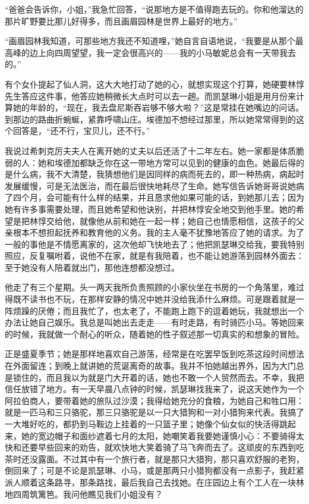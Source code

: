 \par “爸爸会告诉你，小姐，”我急忙回答，“说那地方是不值得跑去玩的。你和他溜达的那片旷野要比那儿好得多，而且画眉园林是世界上最好的地方。”
\par “画眉园林我知道，可那些地方我还不知道哩，”她自言自语地说，“我要是从那个最高峰的边上向四周望望，我一定会很高兴的——我的小马敏妮总会有一天带我去的。”
\par 有个女仆提起了仙人洞，这大大地打动了她的心，就想实现这个打算，她硬要林惇先生答应这件事，他答应她稍微长大点时可以去一趟。而凯瑟琳小姐是用月份来计算她的年龄的，“现在，我去盘尼斯吞岩够不够大啦？”这是常挂在她嘴边的问话。到那边的路曲折蜿蜒，紧靠呼啸山庄。埃德加不想经过那里，所以她常常得到的这个回答是，“还不行，宝贝儿，还不行。”
\par 我说过希刺克厉夫夫人在离开她的丈夫以后还活了十二年左右。她一家都是体质脆弱的人：她和埃德加都缺乏你在这一带地方常可以见到的健康的血色。她最后得的是什么病，我不大清楚，我猜想他们是因同样的病而死去的，即一种热病，病起时发展缓慢，可是无法医治，而在最后很快地耗尽了生命。她写信告诉她哥哥说她病了四个月，会可能有什么样的结果，并且恳求他如果可能的话，到她那儿去；因为她有许多事需要处理，而且她希望和他诀别，并把林惇安全地交到他手里。她的希望是把林惇交给他，就像他从前和她在一起一样；她自己也情愿相信，这孩子的父亲根本不想担起抚养和教育他的义务。我的主人毫不犹豫地答应了她的请求。为了一般的事他是不情愿离家的，这次他却飞快地去了；他把凯瑟琳交给我，要我特别照应，反复嘱咐着，说他不在家，就是有我陪着，也不能让她游荡到园林外面去：至于她没有人陪着就出门，那他连想都没想过。
\par 他走了有三个星期。头一两天我所负责照顾的小家伙坐在书房的一个角落里，难过得既不读书也不玩，在那样安静的情况中她并没给我添什么麻烦。可是跟着就是一阵烦躁的厌倦；而且我忙了，也太老了，不能跑上跑下的逗着她玩，我就想出一个办法让她自己娱乐。我总是叫她出去走走——有时走路，有时骑匹小马。等她回来的时候，我就做一个耐心的听众，随着她的性子叙述那一切真实的和想象的冒险。
\par 正是盛夏季节；她是那样地喜欢自己游荡，经常是在吃罢早饭到吃茶这段时间想法在外面留连；到晚上就讲她的荒诞离奇的故事。我并不怕她越出界外，因为大门总是锁住的，而且我以为就是门大开着的话，她也不敢一个人贸然而去。不幸，我把信任放错了地方。有一天早晨八点钟的时候，凯瑟琳找我来了，说这天她作为一个阿拉伯商人，要带着她的旅队过沙漠；我得给她充分的食粮，为她自己和牲口用：就是一匹马和三只骆驼，那三只骆驼是以一只大猎狗和一对小猎狗来代表。我搞了一大堆好吃的，都扔到马鞍边上挂着的一只篮子里；她像个仙女似的快活得跳起来，她的宽边帽子和面纱遮着七月的太阳，她嘲笑着我要她谨慎小心：不要骑得太快和还要早些回来的劝告，就欢快地大笑着骑了马飞奔而去了。这顽皮的东西到吃茶时还没露面。不过其中有一个旅行者，就是那只大猎狗，那只喜欢舒服的老狗，倒回来了；可是不论是凯瑟琳、小马，或是那两只小猎狗都没有一点影子，我赶紧派人顺着这条路寻，那条路找，最后我自己去找她。在庄园边上有个工人在一块林地四周筑篱笆。我问他瞧见我们小姐没有？
